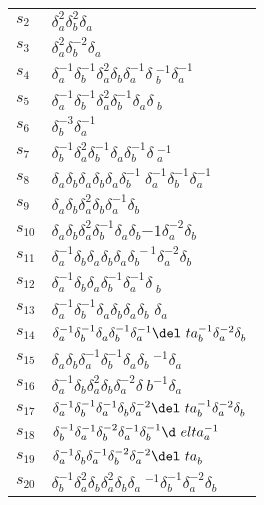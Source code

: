 \documentclass{article}
\begin{document}
\begin{center}
\begin{tabular}{ll}
$s_{2}$ & $\delta_a^{2}\delta_b^{2}\delta_a^{}$ \\
$s_{3}$ & $\delta_a^{2}\delta_b^{-2}\delta_a^{}$ \\
$s_{4}$ & $\delta_a^{-1}\delta_b^{-1}\delta_a^{2}\delta_b^{}\delta_a^{-1}\delta\
_b^{-1}\delta_a^{-1}$ \\
$s_{5}$ & $\delta_a^{-1}\delta_b^{-1}\delta_a^{2}\delta_b^{-1}\delta_a^{}\delta\
_b^{}$ \\
$s_{6}$ & $\delta_b^{-3}\delta_a^{-1}$ \\
$s_{7}$ & $\delta_b^{-1}\delta_a^{2}\delta_b^{-1}\delta_a^{}\delta_b^{-1}\delta\
_a^{-1}$ \\
$s_{8}$ & $\delta_a^{}\delta_b^{}\delta_a^{}\delta_b^{}\delta_a^{}\delta_b^{-1}\
\delta_a^{-1}\delta_b^{-1}\delta_a^{-1}$ \\
$s_{9}$ & $\delta_a^{}\delta_b^{}\delta_a^{2}\delta_b^{}\delta_a^{-1}\delta_b^{\
}$ \\
$s_{10}$ & $\delta_a^{}\delta_b^{}\delta_a^{2}\delta_b^{-1}\delta_a^{}\delta_b^\
{-1}\delta_a^{-2}\delta_b^{}$ \\
$s_{11}$ & $\delta_a^{-1}\delta_b^{}\delta_a^{}\delta_b^{}\delta_a^{}\delta_b^{\
-1}\delta_a^{-2}\delta_b^{}$ \\
$s_{12}$ & $\delta_a^{-1}\delta_b^{}\delta_a^{}\delta_b^{-1}\delta_a^{-1}\delta\
_b^{}$ \\
$s_{13}$ & $\delta_a^{-1}\delta_b^{-1}\delta_a^{}\delta_b^{}\delta_a^{}\delta_b\
^{}\delta_a^{}$ \\
$s_{14}$ & $\delta_a^{-1}\delta_b^{-1}\delta_a^{}\delta_b^{-1}\delta_a^{-1}\del\
ta_b^{-1}\delta_a^{-2}\delta_b^{}$ \\
$s_{15}$ & $\delta_a^{}\delta_b^{}\delta_a^{-1}\delta_b^{-1}\delta_a^{}\delta_b\
^{-1}\delta_a^{}$ \\
$s_{16}$ & $\delta_a^{-1}\delta_b^{}\delta_a^{2}\delta_b^{}\delta_a^{-2}\delta_\
b^{-1}\delta_a^{}$ \\
$s_{17}$ & $\delta_a^{-1}\delta_b^{-1}\delta_a^{-1}\delta_b^{}\delta_a^{-2}\del\
ta_b^{-1}\delta_a^{-2}\delta_b^{}$ \\
$s_{18}$ & $\delta_b^{-1}\delta_a^{-1}\delta_b^{-2}\delta_a^{-1}\delta_b^{-1}\d\
elta_a^{-1}$ \\
$s_{19}$ & $\delta_a^{-1}\delta_b^{}\delta_a^{-1}\delta_b^{-2}\delta_a^{-2}\del\
ta_b^{}$ \\
$s_{20}$ & $\delta_b^{-1}\delta_a^{2}\delta_b^{}\delta_a^{2}\delta_b^{}\delta_a\
^{-1}\delta_b^{-1}\delta_a^{-2}\delta_b^{}$ \\
\bottomrule
\end{tabular}
\end{center}

\thispagestyle{empty}
\end{document}
